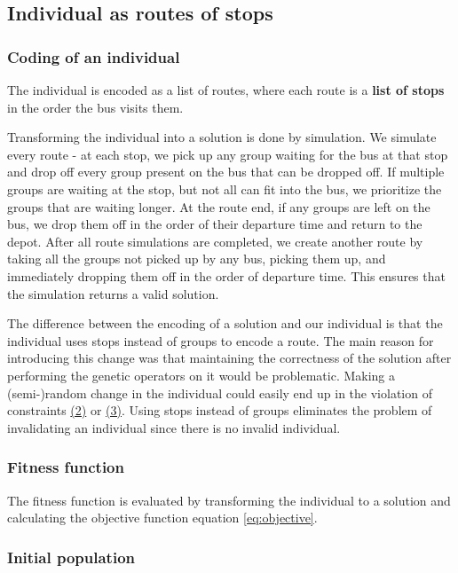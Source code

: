 \subsection{Individual as routes of stops}

\subsubsection{Coding of an individual}

The individual is encoded as a list of routes, where each route is a \textbf{list of stops} in the order the bus visits them.

Transforming the individual into a solution is done by simulation.  We simulate every route - at each stop, we pick up any group waiting for the bus at that stop and drop off every group present on the bus that can be dropped off. If multiple groups are waiting at the stop, but not all can fit into the bus, we prioritize the groups that are waiting longer. At the route end, if any groups are left on the bus, we drop them off in the order of their departure time and return to the depot. After all route simulations are completed, we create another route by taking all the groups not picked up by any bus, picking them up, and immediately dropping them off in the order of departure time. This ensures that the simulation returns a valid solution.

The difference between the encoding of a solution and our individual is that the individual uses stops instead of groups to encode a route. The main reason for introducing this change was that maintaining the correctness of the solution after performing the genetic operators on it would be problematic. Making a (semi-)random change in the individual could easily end up in the violation of constraints \hyperref[constraints]{(2)} or \hyperref[constraints]{(3)}. Using stops instead of groups eliminates the problem of invalidating an individual since there is no invalid individual.

\subsubsection{Fitness function}

The fitness function is evaluated by transforming the individual to a solution and calculating the objective function equation \ref{eq:objective}.

\subsubsection{Initial population}

